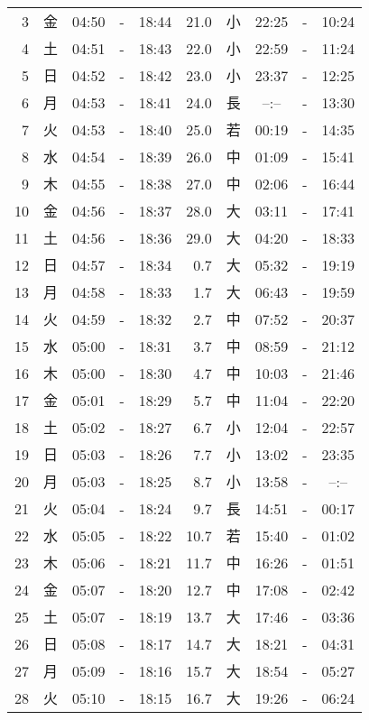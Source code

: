 \documentclass[a4j,10pt]{jsarticle}
\begin{document}
\begin{center}
\begin{table}[ht]
\begin{center}
\begin{tabular}{|rc|ccc|rc|ccc|}
  3 & 金 & 04:50 &-& 18:44 & 21.0 & 小 & 22:25 &-& 10:24 \\
  4 & 土 & 04:51 &-& 18:43 & 22.0 & 小 & 22:59 &-& 11:24 \\
  5 & 日 & 04:52 &-& 18:42 & 23.0 & 小 & 23:37 &-& 12:25 \\
  6 & 月 & 04:53 &-& 18:41 & 24.0 & 長 & --:-- &-& 13:30 \\
  7 & 火 & 04:53 &-& 18:40 & 25.0 & 若 & 00:19 &-& 14:35 \\
  8 & 水 & 04:54 &-& 18:39 & 26.0 & 中 & 01:09 &-& 15:41 \\
  9 & 木 & 04:55 &-& 18:38 & 27.0 & 中 & 02:06 &-& 16:44 \\
 10 & 金 & 04:56 &-& 18:37 & 28.0 & 大 & 03:11 &-& 17:41 \\
 11 & 土 & 04:56 &-& 18:36 & 29.0 & 大 & 04:20 &-& 18:33 \\
 12 & 日 & 04:57 &-& 18:34 &  0.7 & 大 & 05:32 &-& 19:19 \\
 13 & 月 & 04:58 &-& 18:33 &  1.7 & 大 & 06:43 &-& 19:59 \\
 14 & 火 & 04:59 &-& 18:32 &  2.7 & 中 & 07:52 &-& 20:37 \\
 15 & 水 & 05:00 &-& 18:31 &  3.7 & 中 & 08:59 &-& 21:12 \\
 16 & 木 & 05:00 &-& 18:30 &  4.7 & 中 & 10:03 &-& 21:46 \\
 17 & 金 & 05:01 &-& 18:29 &  5.7 & 中 & 11:04 &-& 22:20 \\
 18 & 土 & 05:02 &-& 18:27 &  6.7 & 小 & 12:04 &-& 22:57 \\
 19 & 日 & 05:03 &-& 18:26 &  7.7 & 小 & 13:02 &-& 23:35 \\
 20 & 月 & 05:03 &-& 18:25 &  8.7 & 小 & 13:58 &-& --:-- \\
 21 & 火 & 05:04 &-& 18:24 &  9.7 & 長 & 14:51 &-& 00:17 \\
 22 & 水 & 05:05 &-& 18:22 & 10.7 & 若 & 15:40 &-& 01:02 \\
 23 & 木 & 05:06 &-& 18:21 & 11.7 & 中 & 16:26 &-& 01:51 \\
 24 & 金 & 05:07 &-& 18:20 & 12.7 & 中 & 17:08 &-& 02:42 \\
 25 & 土 & 05:07 &-& 18:19 & 13.7 & 大 & 17:46 &-& 03:36 \\
 26 & 日 & 05:08 &-& 18:17 & 14.7 & 大 & 18:21 &-& 04:31 \\
 27 & 月 & 05:09 &-& 18:16 & 15.7 & 大 & 18:54 &-& 05:27 \\
 28 & 火 & 05:10 &-& 18:15 & 16.7 & 大 & 19:26 &-& 06:24 \\

\end{tabular}
\end{center}
\end{table}
\end{center}
\end{document}
